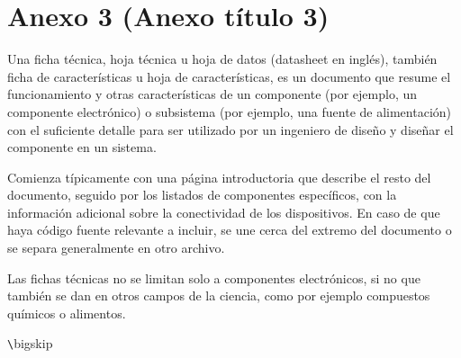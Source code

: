 \chapter{Anexo 3 (Anexo título 3)}

Una ficha técnica, hoja técnica u hoja de datos (datasheet en inglés), también ficha de características u hoja de características, es un documento que resume el funcionamiento y otras características de un componente (por ejemplo, un componente electrónico) o subsistema (por ejemplo, una fuente de alimentación) con el suficiente detalle para ser utilizado por un ingeniero de diseño y diseñar el componente en un sistema.


Comienza típicamente con una página introductoria que describe el resto del documento, seguido por los listados de componentes específicos, con la información adicional sobre la conectividad de los dispositivos. En caso de que haya código fuente relevante a incluir, se une cerca del extremo del documento o se separa generalmente en otro archivo.

Las fichas técnicas no se limitan solo a componentes electrónicos, si no que también se dan en otros campos de la ciencia, como por ejemplo compuestos químicos o alimentos.

\verb+\+bigskip





\endinput 